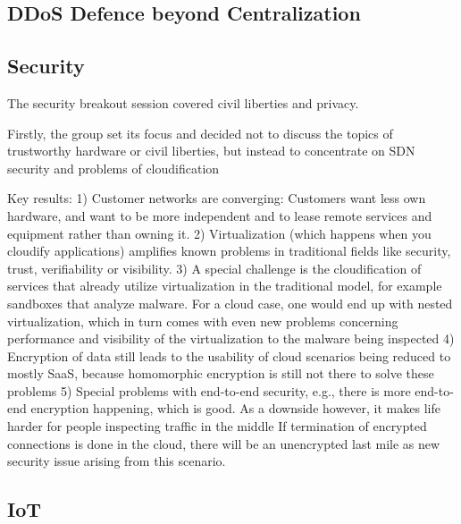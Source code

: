 

\subsection{DDoS Defence beyond Centralization}

\subsection{Security}

The security breakout session covered civil liberties and privacy.

Firstly, the group set its focus and decided not to discuss the topics of trustworthy hardware or civil liberties, but instead to concentrate on SDN security and problems of cloudification

Key results: 1) Customer networks are converging:  Customers want less own hardware, and want to be more independent and to lease remote services and equipment rather than owning it. 
2) Virtualization (which happens when you cloudify applications) amplifies known problems in traditional fields like security, trust, verifiability or visibility.
3) A special challenge is the cloudification of services that already utilize virtualization in the traditional model, for example sandboxes that analyze malware.  For a cloud case, one would end up with nested virtualization, which in turn comes with even new problems concerning performance and visibility of the virtualization to the malware being inspected
4) Encryption of data still leads to the usability of cloud scenarios being reduced to mostly SaaS, because homomorphic encryption is still not there to solve these problems
5) Special problems with end-to-end security, e.g., 
there is more end-to-end encryption happening, which is good.  As a downside however, it makes life harder for people inspecting traffic in the middle
If termination of encrypted connections is done in the cloud, there will be an unencrypted last mile as new security issue arising from this scenario. 

\subsection{IoT}